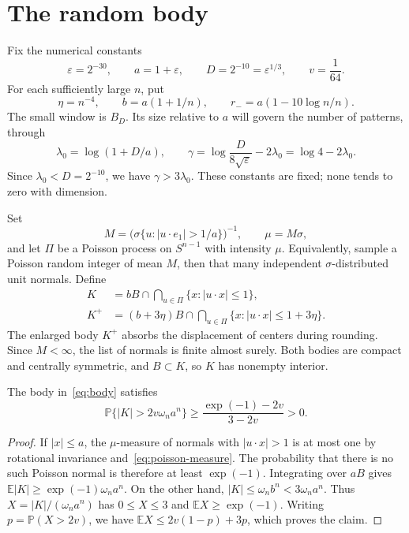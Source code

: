 \section{The random body}\label{sec:construction}

Fix the numerical constants
\begin{equation}\label{eq:fixed-constants}
 \varepsilon=2^{-30},\qquad a=1+\varepsilon,\qquad
 D=2^{-10}=\varepsilon^{1/3},\qquad v=\frac1{64}.
\end{equation}
For each sufficiently large $n$, put
\begin{equation}\label{eq:radii}
 \eta=n^{-4},\qquad b=a(1+1/n),\qquad
 r_-=a(1-10\log n/n).
\end{equation}
The small window is $B_D$. Its size relative to $a$ will govern the number
of patterns, through
\begin{equation}\label{eq:rates}
 \lambda_0=\log(1+D/a),\qquad
 \gamma=\log\frac{D}{8\sqrt\varepsilon}-2\lambda_0
        =\log4-2\lambda_0.
\end{equation}
Since $\lambda_0<D=2^{-10}$, we have $\gamma>3\lambda_0$.
These constants are fixed; none tends to zero with dimension.

Set
\begin{equation}\label{eq:poisson-measure}
 M=\bigl(\sigma\{u:|u\cdot e_1|>1/a\}\bigr)^{-1},\qquad \mu=M\sigma,
\end{equation}
and let $\Pi$ be a Poisson process on $S^{n-1}$ with intensity $\mu$.
Equivalently, sample a Poisson random integer of mean $M$, then that many
independent $\sigma$-distributed unit normals. Define
\begin{align}
 K&=bB\cap\bigcap_{u\in\Pi}\{x:|u\cdot x|\le1\},\label{eq:body}\\
 K^+&=(b+3\eta)B\cap\bigcap_{u\in\Pi}\{x:|u\cdot x|\le1+3\eta\}.
 \label{eq:buffered-body}
\end{align}
The enlarged body $K^+$ absorbs the displacement of centers during rounding.
Since $M<\infty$, the list of normals is finite almost surely. Both bodies
are compact and centrally symmetric, and $B\subset K$, so $K$ has nonempty
interior.

\begin{lemma}\label{lem:volume}
The body in~\eqref{eq:body} satisfies
\[
 \mathbb P\{|K|>2v\omega_n a^n\}
 \ge \frac{\exp(-1)-2v}{3-2v}>0.
\]
\end{lemma}
\begin{proof}
If $|x|\le a$, the $\mu$-measure of normals with $|u\cdot x|>1$ is at
most one by rotational invariance and~\eqref{eq:poisson-measure}. The
probability that there is no such Poisson normal is therefore at least
$\exp(-1)$. Integrating over $aB$ gives
$\mathbb E|K|\ge\exp(-1)\omega_n a^n$.
On the other hand, $|K|\le\omega_n b^n<3\omega_n a^n$. Thus
$X=|K|/(\omega_n a^n)$ has $0\le X\le3$ and $\mathbb E X\ge\exp(-1)$.
Writing $p=\mathbb P(X>2v)$, we have
$\mathbb E X\le2v(1-p)+3p$, which proves the claim.
\end{proof}

